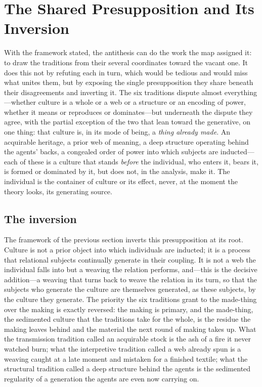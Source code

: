 \section{The Shared Presupposition and Its Inversion}
\label{p24:sec:inversion}

\noindent
With the framework stated, the antithesis can do the work the map assigned it: to draw the traditions from their several coordinates toward the vacant one. It does this not by refuting each in turn, which would be tedious and would miss what unites them, but by exposing the single presupposition they share beneath their disagreements and inverting it. The six traditions dispute almost everything---whether culture is a whole or a web or a structure or an encoding of power, whether it means or reproduces or dominates---but underneath the dispute they agree, with the partial exception of the two that lean toward the generative, on one thing: that culture is, in its mode of being, a \emph{thing already made}. An acquirable heritage, a prior web of meaning, a deep structure operating behind the agents' backs, a congealed order of power into which subjects are inducted---each of these is a culture that stands \emph{before} the individual, who enters it, bears it, is formed or dominated by it, but does not, in the analysis, make it. The individual is the container of culture or its effect, never, at the moment the theory looks, its generating source.

\subsection*{The inversion}

The framework of the previous section inverts this presupposition at its root. Culture is not a prior object into which individuals are inducted; it is a process that relational subjects continually generate in their coupling. It is not a web the individual falls into but a weaving the relation performs, and---this is the decisive addition---a weaving that turns back to weave the relation in its turn, so that the subjects who generate the culture are themselves generated, as these subjects, by the culture they generate. The priority the six traditions grant to the made-thing over the making is exactly reversed: the making is primary, and the made-thing, the sedimented culture that the traditions take for the whole, is the residue the making leaves behind and the material the next round of making takes up. What the transmission tradition called an acquirable stock is the ash of a fire it never watched burn; what the interpretive tradition called a web already spun is a weaving caught at a late moment and mistaken for a finished textile; what the structural tradition called a deep structure behind the agents is the sedimented regularity of a generation the agents are even now carrying on.

